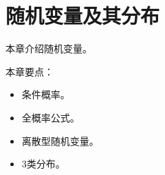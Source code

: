 \chapter{随机变量及其分布}

本章介绍随机变量。

本章要点：
\begin{itemize}
    \item 条件概率。
    \item 全概率公式。
    \item 离散型随机变量。
    \item 3类分布。
\end{itemize}

\newpage


\newpage


\newpage


\newpage


\newpage


\newpage





